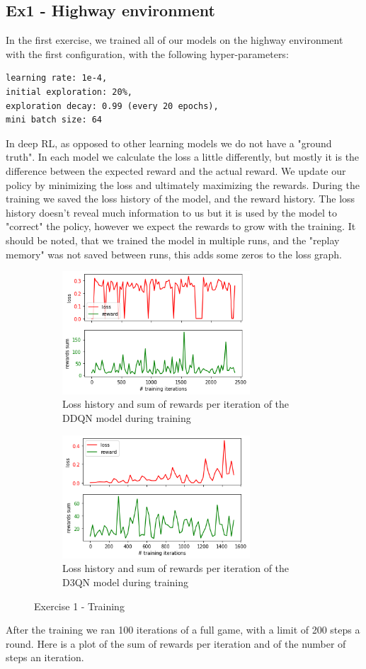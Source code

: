 \documentclass[leqno]{article}
\begin{document}
\begin{multicols}{2}
\subsection{Ex1 - Highway environment}
In the first exercise, we trained all of our models on the highway environment with the first configuration, with the following hyper-parameters:
\begin{lstlisting}
learning rate: 1e-4,
initial exploration: 20%,
exploration decay: 0.99 (every 20 epochs),
mini batch size: 64
\end{lstlisting}
In deep RL, as opposed to other learning models we do not have a "ground truth". In each model we calculate the loss a little differently, but mostly it is the difference between the expected reward and the actual reward. We update our policy by minimizing the loss and ultimately maximizing the rewards. During the training we saved the loss history of the model, and the reward history. The loss history doesn't reveal much information to us but it is used by the model to "correct" the policy, however we expect the rewards to grow with the training. It should be noted, that we trained the model in multiple runs, and the "replay memory" was not saved between runs, this adds some zeros to the loss graph.
\begin{figure}[H]
\centering
  \begin{subfigure}{8cm}
    \centering\includegraphics[width=7cm]{figs/ddqn_ex1_loss.png}
    \caption{Loss history and sum of rewards per iteration of the DDQN model during training}
  \end{subfigure}
  \begin{subfigure}{8cm}
    \centering\includegraphics[width=7cm]{figs/d3qn_ex1_loss.png}
    \caption{Loss history and sum of rewards per iteration of the D3QN model during training}
  \end{subfigure}
  \caption{Exercise 1 - Training}
\end{figure}
 After the training we ran 100 iterations of a full game, with a limit of 200 steps a round. Here is a plot of the sum of rewards per iteration and of the number of steps an iteration.


\end{multicols}
\end{document}
